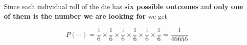%
\begin{frame}
Since each individual roll of the die has \textbf{six possible outcomes} and
\textbf{only one of them is the number we are looking for} we get

$$ P(\cdots) = \frac{1}{6} \times \frac{1}{6} \times \frac{1}{6} \times
\frac{1}{6} \times \frac{1}{6} \times \frac{1}{6} = \frac{1}{46656} $$
\end{frame}
